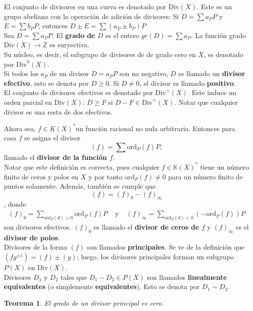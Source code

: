 \documentclass[12pt,a4paper]{report}
\newcommand{\K}{\mathbb{K}}
\newcommand{\ordp}{\mbox{ord}_{P}}
\newcommand{\ds}{\displaystyle}
\newtheorem{teo}{Teorema}[chapter]
\begin{document}
El conjunto de divisores en una curva es denotado por $\mbox{Div}(X)$. Este es un grupo abeliano con la operación de adición de divisores: Si $D= \sum a_{P} P$ y $E=\sum b_{P}P$, entonces $D \pm E = \sum (a_{P} \pm b_{P}) P $\\
Sea $D= \sum a_{P} P$. El \textbf{grado de $D$} es el entero $gr(D)= \sum a_{P}$. La función grado $\mbox{Div}(X)\rightarrow \mathbb{Z}$ es suryectiva. \\
Su núcleo, es decir, el subgrupo de divisores de de grado cero en $X$, es denotado por $\mbox{Div}^{0}(X)$. \\
Si todos los $a_{P}$ de un divisor $D=a_{P}P$ son no negativo, $D$ es llamado un \textbf{divisor efectivo}, esto se denota por $D\geq 0$. Si $D\neq 0 $, el divisor es llamado \textbf{positivo}. \\
El conjunto de divisores efectivos es denotado por $\mbox{Div}^{+}(X)$. Este induce un orden parcial en $\mbox{Div}(X) $: $D \geqslant F$ si $D-F \in \mbox{Div}^{+}(X) $. Notar que cualquier divisor es una resta de dos efectivos.

Ahora sea, $f \in K (X)^{*}$un función racional no nula arbitraria. Entonces para casa $f$ se asigna el divisor $$(f) = \sum \ordp (f) P,$$ llamado el \textbf{divisor de la función $f$}. \\
Notar que este definición es correcta, pues cualquier $ f\in \K(X)^{*}$ tiene un número finito de ceros y polos en $X$ y por tanto $\ordp (f) \neq 0$ para un número finito de puntos solamente. Además, también se cumple que $$ (f) = (f)_{0} - (f)_{\infty}  $$, donde 
$$ \begin{array}{ccc}
\ds (f)_{0} = \sum_{\ordp (d)>0} \ordp (f)P & \mbox{ y } & \ds (f)_{\infty} = \sum_{\ordp (d)<0} (-\ordp (f))P
\end{array}$$
son divisores efectivos. $(f)_{0}$ es llamado el \textbf{divisor de ceros de $f$} y $(f)_{\infty}$ es el \textbf{divisor de polos}.\\

Divisores de la forma $(f)$ son llamados \textbf{principales}. Se ve de la definición que $(fg ^{\pm 1}) = (f) \pm (g)$; luego, los divisores principales forman un subgrupo $P(X)$ en $\mbox{Div}(X)$.\\
Divisores $D_{1}$ y $D_{2}$ tales que $D_{1} - D_{2} \in P(X) $ son llamados \textbf{linealmente equivalentes} (o simplemente \textbf{equivalentes}). Esto se denota por $D_{1}\sim D_{2}$. 

\begin{teo} \label{2.1.52}
	El grado de un divisor principal es cero.
\end{teo}
\end{document}
